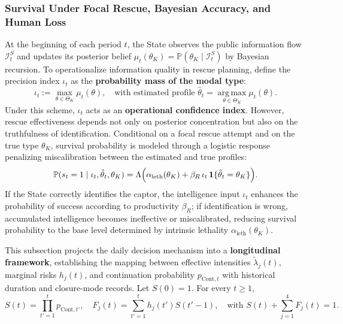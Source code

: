 \documentclass[12pt,a4paper]{article}
\theoremstyle{plain}
\theoremstyle{definition}
\theoremstyle{remark}
\newcommand{\ProbE}{\mathbb{P}}
\newcommand{\1}{\mathbf{1}}
\begin{document}
\subsubsection{Survival Under Focal Rescue, Bayesian Accuracy, and Human Loss}
\label{subsec:rescate-survival-precision}

At the beginning of each period $t$, the State observes the public information flow
$\mathcal I_t^S$ and updates its posterior belief
$\mu_t(\theta_K)=\ProbE(\theta_K\mid\mathcal I_t^S)$ by Bayesian recursion. To
operationalize information quality in rescue planning, define the precision index
$\iota_t$ as the \textbf{probability mass of the modal type}:
\begin{equation}
\label{eq:iota-precision-mode}
\iota_t:=\max_{\theta\in\Theta_K}\mu_t(\theta),
\quad
\text{with estimated profile }
\hat{\theta}_t=\operatorname*{arg\,max}_{\theta\in\Theta_K}\mu_t(\theta).
\end{equation}
Under this scheme, $\iota_t$ acts as an \textbf{operational confidence index}. However,
rescue effectiveness depends not only on posterior concentration but also on the
truthfulness of identification. Conditional on a focal rescue attempt and on the true
type $\theta_K$, survival probability is modeled through a logistic response penalizing
miscalibration between the estimated and true profiles:
\begin{equation}
\label{eq:p-surv-rescue-logit-ajustado}
\ProbE(s_t=1\mid\iota_t,\hat{\theta}_t,\theta_K)
=
\Lambda\Bigl(\alpha_{\mathrm{leth}}(\theta_K)
+\beta_R\,\iota_t\,\mathbf{1}\{\hat{\theta}_t=\theta_K\}\Bigr).
\end{equation}
If the State correctly identifies the captor, the intelligence input $\iota_t$
enhances the probability of success according to productivity $\beta_R$; if
identification is wrong, accumulated intelligence becomes ineffective or miscalibrated,
reducing survival probability to the base level determined by intrinsic lethality
$\alpha_{\mathrm{leth}}(\theta_K)$.

This subsection projects the daily decision mechanism into a \textbf{longitudinal
framework}, establishing the mapping between effective intensities
$\tilde\lambda_j(t)$, marginal risks $h_j(t)$, and continuation probability
$p_{\mathrm{Cont},t}$ with historical duration and closure-mode records. Let $S(0)=1$.
For every $t\ge1$,
\begin{equation}
\label{eq:longitudinal-system}
S(t)=\prod_{t'=1}^{t}p_{\mathrm{Cont},t'},
\quad
F_j(t)=\sum_{t'=1}^{t}h_j(t')S(t'-1),
\quad
\text{with } S(t)+\sum_{j=1}^{4}F_j(t)=1.
\end{equation}
\end{document}
